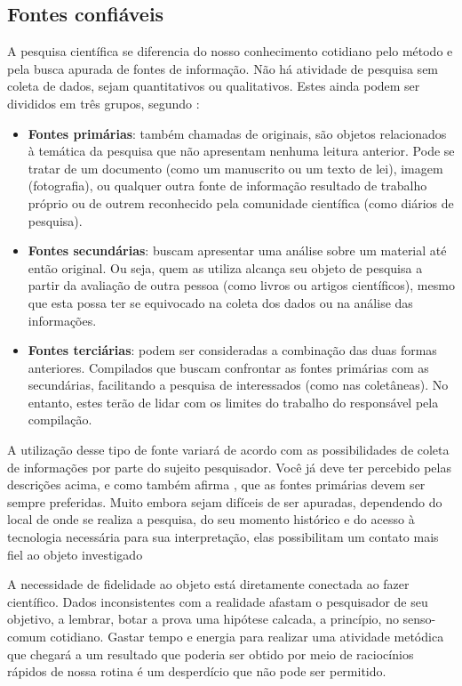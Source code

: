 \subsection{Fontes confiáveis}


A pesquisa científica se diferencia do nosso conhecimento cotidiano pelo método e pela busca apurada de fontes de informação. Não há atividade de pesquisa sem coleta de dados, sejam quantitativos ou qualitativos. Estes ainda podem ser divididos em três grupos, segundo \citet{gil2002}:

\begin{itemize}
\item \textbf{Fontes primárias}: também chamadas de originais, são objetos relacionados à temática da pesquisa que não apresentam nenhuma leitura anterior. Pode se tratar de um documento (como um manuscrito ou um texto de lei), imagem (fotografia), ou qualquer outra fonte de informação resultado de trabalho próprio ou de outrem reconhecido pela comunidade científica (como diários de pesquisa).
\item \textbf{Fontes secundárias}: buscam apresentar uma análise sobre um material até então original. Ou seja, quem as utiliza alcança seu objeto de pesquisa a partir da avaliação de outra pessoa (como livros ou artigos científicos), mesmo que esta possa ter se equivocado na coleta dos dados ou na análise das informações.
\item \textbf{Fontes terciárias}: podem ser consideradas a combinação das duas formas anteriores. Compilados que buscam confrontar as fontes primárias com as secundárias, facilitando a pesquisa de interessados (como nas coletâneas). No entanto, estes terão de lidar com os limites do trabalho do responsável pela compilação.
\end{itemize}

A utilização desse tipo de fonte variará de acordo com as possibilidades de coleta de informações por parte do sujeito pesquisador. Você já deve ter percebido pelas descrições acima, e como também afirma \citet{eco2008}, que as fontes primárias devem ser sempre preferidas. Muito embora sejam difíceis de ser apuradas, dependendo do local de onde se realiza a pesquisa, do seu momento histórico e do acesso à tecnologia necessária para sua interpretação, elas possibilitam um contato mais fiel ao objeto investigado

A necessidade de fidelidade ao objeto está diretamente conectada ao fazer científico. Dados inconsistentes com a realidade afastam o pesquisador de seu objetivo, a lembrar, botar a prova uma hipótese calcada, a princípio, no senso-comum cotidiano. Gastar tempo e energia para realizar uma atividade metódica que chegará a um resultado que poderia ser obtido por meio de raciocínios rápidos de nossa rotina é um desperdício que não pode ser permitido.

